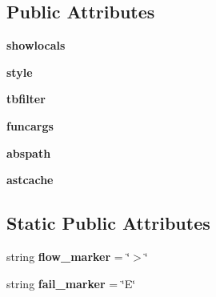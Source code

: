 \subsection*{Public Attributes}
\begin{DoxyCompactItemize}
\item 
\mbox{\label{classpy_1_1__code_1_1code_1_1_formatted_excinfo_ac5154eca2b914744825a408718e6edef}} 
{\bfseries showlocals}
\item 
\mbox{\label{classpy_1_1__code_1_1code_1_1_formatted_excinfo_ad0a9851ec77ac1327c8227ea1796abae}} 
{\bfseries style}
\item 
\mbox{\label{classpy_1_1__code_1_1code_1_1_formatted_excinfo_ae10e6655ab18e18c2bbd61e9e359dea2}} 
{\bfseries tbfilter}
\item 
\mbox{\label{classpy_1_1__code_1_1code_1_1_formatted_excinfo_a1a5bd01f6f1de1351d793c1567f74e5b}} 
{\bfseries funcargs}
\item 
\mbox{\label{classpy_1_1__code_1_1code_1_1_formatted_excinfo_afde051efa562c45303bbbf8c3d18013a}} 
{\bfseries abspath}
\item 
\mbox{\label{classpy_1_1__code_1_1code_1_1_formatted_excinfo_af87bb964a040f076d2e946c01dda312c}} 
{\bfseries astcache}
\end{DoxyCompactItemize}
\subsection*{Static Public Attributes}
\begin{DoxyCompactItemize}
\item 
\mbox{\label{classpy_1_1__code_1_1code_1_1_formatted_excinfo_a5e02533efc347244ae95f9a03513dede}} 
string {\bfseries flow\+\_\+marker} = \char`\"{}$>$\char`\"{}
\item 
\mbox{\label{classpy_1_1__code_1_1code_1_1_formatted_excinfo_a9a7bea6584ff5cc2d291c9e8bcc2b600}} 
string {\bfseries fail\+\_\+marker} = \char`\"{}E\char`\"{}
\end{DoxyCompactItemize}


